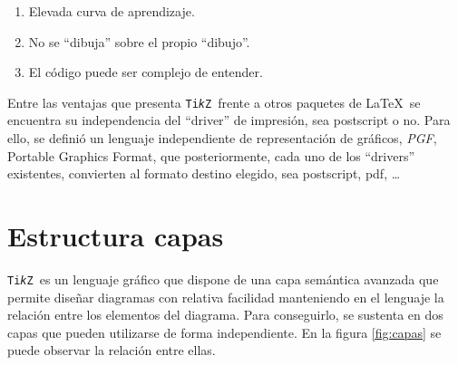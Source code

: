 \documentclass[a4paper,10pt]{article}
\newcommand{\ttikz}{{\tt Ti\emph{k}Z}}
\begin{document}
\begin{enumerate}
    \item Elevada curva de aprendizaje.
    \item No se “dibuja” sobre el propio “dibujo”.
    \item El código puede ser complejo de entender.
\end{enumerate}


Entre las ventajas que presenta \ttikz\ frente a otros paquetes de \LaTeX\ se encuentra su independencia del “driver” de impresión, sea postscript o no. Para ello, se definió un lenguaje independiente de representación de gráficos, \emph{PGF}, Portable Graphics Format, que posteriormente, cada uno de los “drivers” existentes, convierten al formato destino elegido, sea postscript, pdf, \ldots 

\section{Estructura capas}


\ttikz\ es un lenguaje gráfico que dispone de una capa semántica avanzada que permite diseñar diagramas con relativa facilidad manteniendo en el lenguaje la relación entre los elementos del diagrama. Para conseguirlo, se sustenta en dos capas que pueden utilizarse de forma independiente. En la figura \ref{fig:capas} se puede observar la relación entre ellas.
\end{document}
